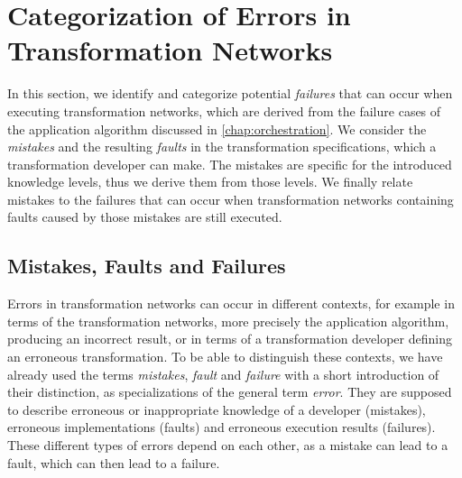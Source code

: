 \section{Categorization of Errors in Transformation Networks}


In this section, we identify and categorize potential \emph{failures} that can occur when executing transformation networks, which are derived from the failure cases of the application algorithm discussed in \autoref{chap:orchestration}.
We consider the \emph{mistakes} and the resulting \emph{faults} in the transformation specifications, which a transformation developer can make.
The mistakes are specific for the introduced knowledge levels, thus we derive them from those levels.
We finally relate mistakes to the failures that can occur when transformation networks containing faults caused by those mistakes are still executed.


\subsection{Mistakes, Faults and Failures}

Errors in transformation networks can occur in different contexts, for example in terms of the transformation networks, more precisely the application algorithm, producing an incorrect result, or in terms of a transformation developer defining an erroneous transformation.
To be able to distinguish these contexts, we have already used the terms \emph{mistakes}, \emph{fault} and \emph{failure} with a short introduction of their distinction, as specializations of the general term \emph{error}.
They are supposed to describe erroneous or inappropriate knowledge of a developer (mistakes), erroneous implementations (faults) and erroneous execution results (failures).
These different types of errors depend on each other, as a mistake can lead to a fault, which can then lead to a failure.

